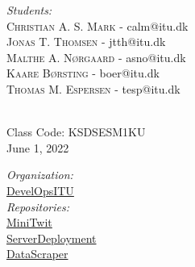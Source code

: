 \begin{titlepage}

\begin{minipage}{0.6\textwidth}
\center
\emph{Students:}\\
\textsc{Christian A. S. Mark} - calm@itu.dk\\
\textsc{Jonas T. Thomsen} - jtth@itu.dk\\ \textsc{Malthe A. Nørgaard} - asno@itu.dk\\ \textsc{Kaare Børsting} - boer@itu.dk\\ \textsc{Thomas M. Espersen} - tesp@itu.dk\\


\end{minipage}\\[2cm]



Class Code: KSDSESM1KU\\
{\large June 1, 2022}\\[2cm] %


\begin{minipage}{0.6\textwidth}
\center
\emph{Organization:}\\
\href{https://github.com/DevelOpsITU}{DevelOpsITU}\\[0.5cm]

\emph{Repositories:}\\
\href{https://github.com/DevelOpsITU/MiniTwit}{MiniTwit}\\
\href{https://github.com/DevelOpsITU/ServerDeployment}{ServerDeployment}\\
\href{https://github.com/DevelOpsITU/DataScraper}{DataScraper}\\
\end{minipage}

\vfill %

\end{titlepage}

